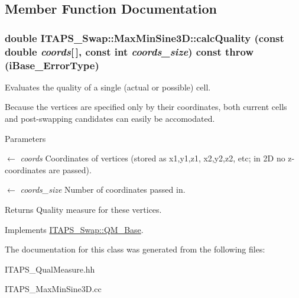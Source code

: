 \subsection{Member Function Documentation}
\hypertarget{class_i_t_a_p_s___swap_1_1_max_min_sine3_d_a4856dd6b9712f90d6327f1c651b90471}{
\subsubsection[{calcQuality}]{\setlength{\rightskip}{0pt plus 5cm}double ITAPS\_\-Swap::MaxMinSine3D::calcQuality (const double {\em coords}\mbox{[}$\,$\mbox{]}, \/  const int {\em coords\_\-size}) const  throw (iBase\_\-ErrorType)}}
\label{class_i_t_a_p_s___swap_1_1_max_min_sine3_d_a4856dd6b9712f90d6327f1c651b90471}


Evaluates the quality of a single (actual or possible) cell. 

Because the vertices are specified only by their coordinates, both current cells and post-\/swapping candidates can easily be accomodated.


\begin{DoxyParams}{Parameters}
\item[\mbox{$\leftarrow$} {\em coords}]Coordinates of vertices (stored as x1,y1,z1, x2,y2,z2, etc; in 2D no z-\/coordinates are passed).\item[\mbox{$\leftarrow$} {\em coords\_\-size}]Number of coordinates passed in.\end{DoxyParams}
\begin{DoxyReturn}{Returns}
Quality measure for these vertices. 
\end{DoxyReturn}


Implements \hyperlink{class_i_t_a_p_s___swap_1_1_q_m___base_aea047b3afc06b75a1115bbaddd8286ee}{ITAPS\_\-Swap::QM\_\-Base}.



The documentation for this class was generated from the following files:\begin{DoxyCompactItemize}
\item 
ITAPS\_\-QualMeasure.hh\item 
ITAPS\_\-MaxMinSine3D.cc\end{DoxyCompactItemize}
